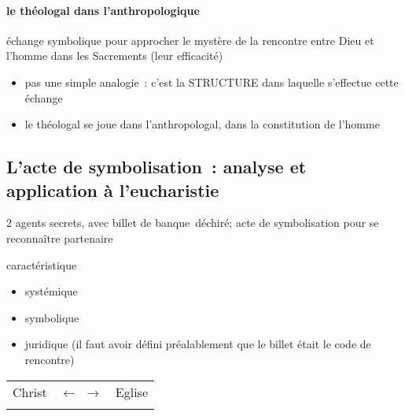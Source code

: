 \hypertarget{d.-le-thuxe9ologal-dans-lanthropologique}{%
\paragraph{le théologal dans
l'anthropologique}\label{d.-le-thuxe9ologal-dans-lanthropologique}}

échange symbolique pour approcher le mystère de la rencontre entre Dieu
et l'homme dans les Sacrements (leur efficacité)

\begin{itemize}
\item
  pas une simple analogie~: c'est la STRUCTURE dans laquelle s'effectue
  cette échange
\item
  le théologal se joue dans l'anthropologal, dans la constitution de
  l'homme
\end{itemize}

\hypertarget{lacte-de-symbolisation-analyse-et-application-uxe0-leucharistie}{%
\subsection{L'acte de symbolisation~: analyse et application à
l'eucharistie}\label{lacte-de-symbolisation-analyse-et-application-uxe0-leucharistie}}

2 agents secrets, avec billet de banque~déchiré; acte de symbolisation
pour se reconnaître partenaire

caractéristique

\begin{itemize}
\item
  systémique
\item
  symbolique
\item
  juridique (il faut avoir défini préalablement que le billet était le
  code de rencontre)
\end{itemize}

 

\begin{table}[h!]
    \centering
 
\begin{tabular}{p{}p{}p{}}
\toprule
Christ &$\leftarrow$ $\rightarrow$ & Eglise \\
 
\\
\bottomrule
\end{tabular}
\label{tab:my_label}
\end{table}

